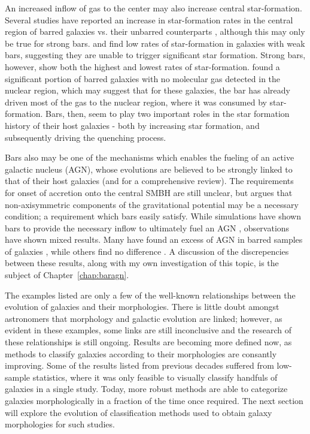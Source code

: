 An increased inflow of gas to the center may also increase central star-formation. Several studies have reported an increase in star-formation rates in the central region of barred galaxies vs. their unbarred counterparts \citep{Hawarden1986,Ho1997}, although this may only be true for strong bars. \citet{Martinet1997} and \citet{Zhou2014} find low rates of star-formation in galaxies with weak bars, suggesting they are unable to trigger significant star formation. Strong bars, however, show both the highest and lowest rates of star-formation. \citep{Sheth2005} found a significant portion of barred galaxies with no molecular gas detected in the nuclear region, which may suggest that for these galaxies, the bar has already driven most of the gas to the nuclear region, where it was consumed by star-formation. Bars, then, seem to play two important roles in the star formation history of their host galaxies - both by increasing star formation, and subsequently driving the quenching process.

Bars also may be one of the mechanisms which enables the fueling of an active galactic nucleus (AGN), whose evolutions are believed to be strongly linked to that of their host galaxies \citep{Schawinski2007, Schawinski2010, Antonini2015, Yang2017, Zubovas2017} (and \citet{Heckman2014} for a comprehensive review). The requirements for onset of accretion onto the central SMBH are still unclear, but \citet{Moles1995} argues that non-axisymmetric components of the gravitational potential may be a necessary condition; a requirement which bars easily satisfy. While simulations have shown bars to provide the necessary inflow to ultimately fuel an AGN \citep{Athanassoula1992,Friedli1993}, observations have shown mixed results. Many have found an excess of AGN in barred samples of galaxies \citep{Knapen2000,Oh2012}, while others find no difference \citep{Ho1997,Mulchaey1997,Cheung2015}. A discussion of the discrepencies between these results, along with my own investigation of this topic, is the subject of Chapter~\ref{chap:baragn}. 

The examples listed are only a few of the well-known relationships between the evolution of galaxies and their morphologies. There is little doubt amongst astronomers that morphology and galactic evolution are linked; however, as evident in these examples, some links are still inconclusive and the research of these relationships is still ongoing. Results are becoming more defined now, as methods to classify galaxies according to their morphologies are consantly improving. Some of the results listed from previous decades suffered from low-sample statistics, where it was only feasible to visually classify handfuls of galaxies in a single study. Today, more robust methods are able to categorize galaxies morphologically in a fraction of the time once required. The next section will explore the evolution of classification methods used to obtain galaxy morphologies for such studies. 



